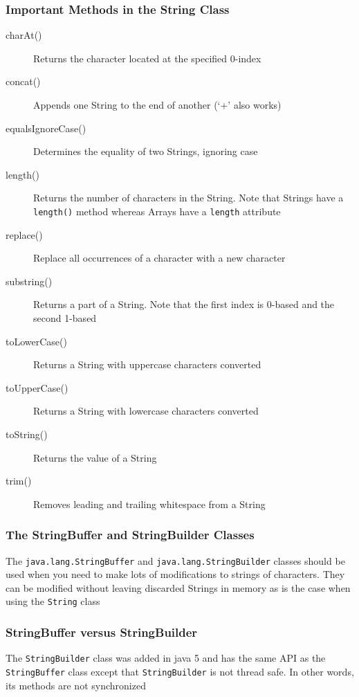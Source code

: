 \subsubsection{Important Methods in the String Class}
\begin{description}
    \item[charAt()] Returns the character located at the specified 0-index
    \item[concat()] Appends one String to the end of another (`+' also works)
    \item[equalsIgnoreCase()] Determines the equality of two Strings, ignoring 
    case
    \item[length()] Returns the number of characters in the String. Note that 
    Strings have a \verb#length()# method whereas Arrays have a \verb#length# 
    attribute
    \item[replace()] Replace all occurrences of a character with a new 
    character
    \item[substring()] Returns a part of a String. Note that the first index is 
    0-based and the second 1-based
    \item[toLowerCase()] Returns a String with uppercase characters converted
    \item[toUpperCase()] Returns a String with lowercase characters converted
    \item[toString()] Returns the value of a String
    \item[trim()] Removes leading and trailing whitespace from a String
\end{description}

\subsubsection{The StringBuffer and StringBuilder Classes}
The \verb#java.lang.StringBuffer# and \verb#java.lang.StringBuilder# classes 
should be used when you need to make lots of modifications to strings of 
characters. They can be modified without leaving discarded Strings in memory as 
is the case when using the \verb#String# class

\subsubsection{StringBuffer versus StringBuilder}
The \verb#StringBuilder# class was added in java 5 and has the same API as the 
\verb#StringBuffer# class except that \verb#StringBuilder# is not thread safe.  
In other words, its methods are not synchronized

